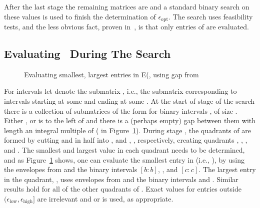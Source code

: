 \documentclass[11pt]{article}
\newcommand{\inter}[2]{\ensuremath{[#1\!:\!#2]}}
\newcommand{\epslow}{\ensuremath{\epsilon_\mathrm{low}}}
\newcommand{\epshigh}{\ensuremath{\epsilon_\mathrm{high}}}
\newcommand{\epsopt}{\ensuremath{\epsilon_\mathrm{opt}}}
\newcommand{\epsinterval}[1]{\ensuremath{(\epslow,\epshigh#1}}
\begin{document}
After the last stage the remaining matrices are  and a standard binary search on these values is used to finish the determination of \epsopt.
The search uses  feasibility tests, and the less obvious fact, proven in~\cite{FredericksonJohnsonSortedMatrix}, is that only  entries of  are evaluated.





\subsection{Evaluating \, During The Search}

\begin{figure}

\begin{center}
\end{center}
\vspace*{-0.2in}

\caption{Evaluating smallest, largest entries in E(,  using gap from }  \label{fig:Eexplain}
\vspace*{-0.08in}
\hrulefill
\vspace*{-0.15in}
\end{figure}



For intervals  let  denote the submatrix ,
i.e., the submatrix corresponding to intervals starting at some  and ending at some .
At the start of stage  of the search there is a collection of submatrices of the form  for binary intervals ,  of size .
Either , or  is to the left of  and there is a (perhaps empty) gap between them with length an integral multiple of  ( in Figure~\ref{fig:Eexplain}).
During stage , the quadrants of  are formed by cutting  and  in half into ,  and , , respectively, creating quadrants , , , and .
The smallest and largest value in each quadrant needs to be determined, and as Figure~\ref{fig:Eexplain} shows, one can evaluate the smallest entry in  (i.e., ), by using the envelopes from  and the binary intervals \inter{b}{b}, , and \inter{c}{c}.
The largest entry in the quadrant, , uses envelopes from  and the binary intervals  and .
Similar results hold for all of the other quadrants of .
Exact values for entries outside \epsinterval{]} are irrelevant and  or  is used, as appropriate.
\end{document}
